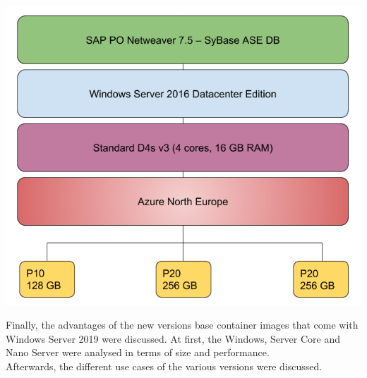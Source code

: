 \documentclass[a0,portrait]{a0poster}
\begin{document}
\begin{multicols}{2}
\begin{center}\vspace{1cm}
    \includegraphics[width=1.0\linewidth]{../bachproef/img/Methodologie/SAP_PO}
\end{center}\vspace{1cm}
\vfill\null
\columnbreak

Finally, the advantages of the new versions base container images that come with Windows Server 2019 were discussed.
At first, the Windows, Server Core and Nano Server were analysed in terms of size and performance. \\
Afterwards, the different use cases of the various versions were discussed.


\end{multicols}
\end{document}

